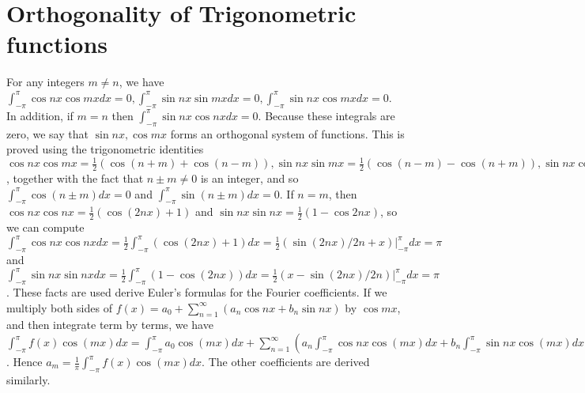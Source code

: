 {\section{Orthogonality of Trigonometric functions}
For any integers $m\neq n$, we have $\int_{-\pi}^\pi \cos nx \cos mx dx =0, \int_{-\pi}^\pi \sin nx \sin mx dx =0, \int_{-\pi}^\pi \sin nx \cos mx dx =0$.  In addition, if $m=n$ then $\int_{-\pi}^\pi \sin nx \cos nx dx =0$.  Because these integrals are zero, we say that $\sin nx, \cos mx$ forms an orthogonal system of functions. This is proved using the trigonometric identities $\cos nx \cos mx = \frac{1}{2}(\cos(n+m)+\cos(n-m)), \sin nx \sin mx = \frac{1}{2}(\cos(n-m)-\cos(n+m)), \sin nx \cos mx = \frac{1}{2}(\sin(n+m)+\sin(n-m))$, together with the fact that $n\pm m\neq 0$ is an integer, and so $\int_{-\pi}^\pi \cos (n\pm m) dx =0$ and $\int_{-\pi}^\pi \sin (n\pm m) dx =0$. If $n=m$, then $\cos nx \cos nx= \frac{1}{2}(\cos(2nx)+1)$ and $\sin nx \sin nx= \frac{1}{2}(1-\cos 2nx)$, so we can compute 
$
\int_{-\pi}^\pi \cos nx \cos nx dx = 
\frac{1}{2}\int_{-\pi}^\pi (\cos(2nx)+1) dx = 
\frac{1}{2} (\sin(2nx)/2n+x)\big|_{-\pi}^\pi dx = 
\pi
$ 
and
$
\int_{-\pi}^\pi \sin nx \sin nx dx = 
\frac{1}{2}\int_{-\pi}^\pi (1-\cos(2nx)) dx = 
\frac{1}{2} (x-\sin(2nx)/2n)\big|_{-\pi}^\pi dx = 
\pi
$.  These facts are used derive Euler's formulas for the Fourier coefficients.  If we multiply both sides of 
$f(x) = a_0 + \sum_{n=1}^\infty (a_n\cos nx +b_n\sin nx)$
by $\cos mx$, and then integrate term by terms, we have 
$\int_{-\pi}^{\pi} f(x)\cos(mx)dx = \int_{-\pi}^{\pi}a_0 \cos(mx)dx + \sum_{n=1}^\infty (a_n\int_{-\pi}^{\pi}\cos nx \cos(mx)dx +b_n\int_{-\pi}^{\pi}\sin nx \cos(mx)dx) = 0+a_m\pi$.  Hence $a_m = \frac{1}{\pi}\int_{-\pi}^{\pi} f(x)\cos(mx)dx$.  The other coefficients are derived similarly.

}
